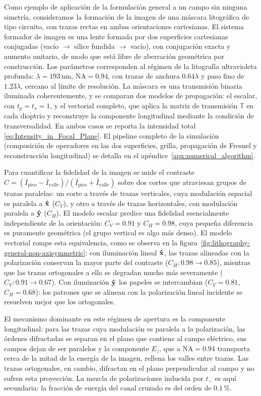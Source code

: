 Como ejemplo de aplicación de la formulación general a un campo sin ninguna
simetría, consideramos la formación de la imagen de una máscara litográfica de
tipo circuito, con trazas rectas en ambas orientaciones cartesianas. El sistema
formador de imagen es una lente formada por dos superficies cartesianas
conjugadas (vacío $\to$ sílice fundida $\to$ vacío), con conjugación exacta y
aumento unitario, de modo que está libre de aberración
geométrica por construcción. Los parámetros corresponden al régimen de la
litografía ultravioleta profunda: $\lambda=193\,\mathrm{nm}$,
$\mathrm{NA}=0.94$, con trazas de anchura $0.64\lambda$ y paso fino de
$1.23\lambda$, cercano al límite de resolución. La máscara es una transmisión
binaria iluminada coherentemente, y se comparan dos modelos de propagación: el
escalar, con $t_p=t_s=1$, y el vectorial completo, que aplica la matriz de
transmisión $\mathbb T$ en cada dioptrio y reconstruye la componente
longitudinal mediante la condición de transversalidad. En ambos casos se
reporta la intensidad total \eqref{eq:Intensity_in_Focal_Plane}. El pipeline
completo de la simulación (composición de operadores en las dos superficies,
grilla, propagación de Fresnel y reconstrucción longitudinal) se detalla en
el apéndice~\ref{apx:numerical_algorithm}.

Para cuantificar la fidelidad de la imagen se mide el contraste
$C=(\bar I_{\mathrm{pico}}-\bar I_{\mathrm{valle}})/(\bar
I_{\mathrm{pico}}+\bar I_{\mathrm{valle}})$ sobre dos cortes que atraviesan
grupos de trazas paralelas: un corte a través de trazas verticales, cuya
modulación espacial es paralela a $\bm{\hat{\mathbf{x}}}$ ($C_V$), y otro a través de
trazas horizontales, con modulación paralela a $\bm{\hat{\mathbf{y}}}$ ($C_H$). El
modelo escalar predice una fidelidad esencialmente independiente de la
orientación: $C_V=0.91$ y $C_H=0.98$, cuya pequeña diferencia es puramente
geométrica (el grupo vertical es algo más denso). El modelo vectorial rompe
esta equivalencia, como se observa en la
figura~\ref{fig:lithography-general-non-axisymmetric}: con iluminación lineal
$\bm{\hat{\mathbf{x}}}$, las trazas alineadas con la polarización conservan la mayor
parte del contraste ($C_H: 0.98\to 0.85$), mientras que las trazas ortogonales
a ella se degradan mucho más severamente ($C_V: 0.91\to 0.67$). Con iluminación
$\bm{\hat{\mathbf{y}}}$ los papeles se intercambian ($C_V=0.81$, $C_H=0.68$): los
patrones que se alinean con la polarización lineal incidente se resuelven
mejor que los ortogonales.

El mecanismo dominante en este régimen de apertura es la componente
longitudinal: para las trazas cuya modulación es paralela a la polarización,
las órdenes difractadas se separan en el plano que contiene al campo eléctrico,
sus campos dejan de ser paralelos y la componente $E_z$, que a
$\mathrm{NA}=0.94$ transporta cerca de la mitad de la energía de la imagen,
rellena los valles entre trazas. Las trazas ortogonales, en cambio, difractan
en el plano perpendicular al campo y no sufren esta proyección. La mezcla de
polarizaciones inducida por $t_-$ es aquí secundaria: la fracción de energía
del canal cruzado es del orden de $0.1\,\%$.


